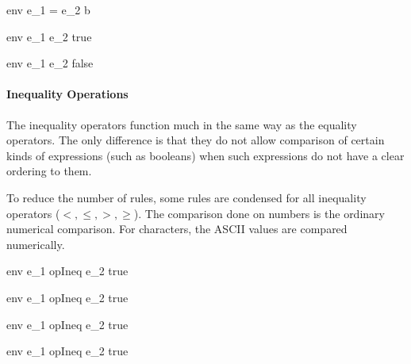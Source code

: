 \documentclass{article}
\begin{document}
	{\mbox{env} \vdash e_1 = e_2 \Downarrow b}
	
\bigskip
	
	{\mbox{env} \vdash e_1 \neq e_2 \Downarrow true}
	
	{\mbox{env} \vdash e_1 \neq e_2 \Downarrow false}
	
\bigskip

\paragraph{Inequality Operations}
The inequality operators function much in the same way as the equality operators.
The only difference is that they do not allow comparison of certain kinds of expressions (such as booleans) when such expressions do not have a clear ordering to them.

To reduce the number of rules, some rules are condensed for all inequality operators ($<, \leq, >, \geq$).
The comparison done on numbers is the ordinary numerical comparison.
For characters, the ASCII values are compared numerically.

	{\mbox{env} \vdash e_1 \; opIneq \; e_2 \Downarrow true}
	
	{\mbox{env} \vdash e_1 \; opIneq \; e_2 \Downarrow true}
	
\medskip

	{\mbox{env} \vdash e_1 \; opIneq \; e_2 \Downarrow true}
	
	{\mbox{env} \vdash e_1 \; opIneq \; e_2 \Downarrow true}
\end{document}
